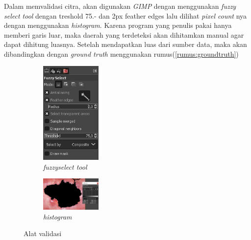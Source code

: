 Dalam memvalidasi citra, akan digunakan 
\textit{GIMP} dengan menggunakan \textit{fuzzy select tool} 
dengan treshold 75.- dan 2px feather edges lalu dilihat 
\textit{pixel count} nya dengan menggunakan \textit{histogram}. 
Karena program yang penulis pakai hanya memberi garis luar, maka 
daerah yang terdeteksi akan dihitamkan manual agar dapat 
dihitung luasnya. Setelah mendapatkan luas dari sumber data, 
maka akan dibandingkan dengan \textit{ground truth} menggunakan 
rumus(\ref{rumus:groundtruth})
\begin{figure}[H]
	\centering
	\begin{subfigure}{.3\textwidth}
		\centering
		\includegraphics[keepaspectratio, width=3cm]{gambar/Bab4/fuzzyselect.jpg}
		\caption{\textit{fuzzyselect tool}}
	\end{subfigure}
	\begin{subfigure}{.4\textwidth}
		\centering
		\includegraphics[keepaspectratio, width=3cm]{gambar/Bab4/histogram.jpg}
		\caption{\textit{histogram}}
	\end{subfigure} 
	\caption{Alat validasi}
\end{figure}

